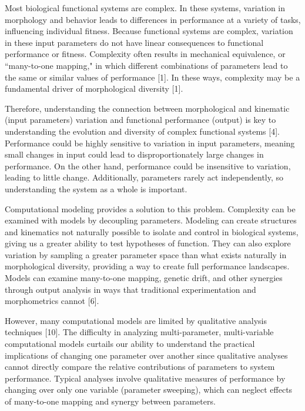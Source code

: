 \documentclass[
]{article}
\begin{document}
Most biological functional systems are complex. In these systems,
variation in morphology and behavior leads to differences in performance
at a variety of tasks, influencing individual fitness. Because
functional systems are complex, variation in these input parameters do
not have linear consequences to functional performance or fitness.
Complexity often results in mechanical equivalence, or ``many-to-one
mapping," in which different combinations of parameters lead to the same
or similar values of performance {[}1{]}. In these ways, complexity may
be a fundamental driver of morphological diversity {[}1{]}.

Therefore, understanding the connection between morphological and
kinematic (input parameters) variation and functional performance
(output) is key to understanding the evolution and diversity of complex
functional systems {[}4{]}. Performance could be highly sensitive to
variation in input parameters, meaning small changes in input could lead
to disproportionately large changes in performance. On the other hand,
performance could be insensitive to variation, leading to little change.
Additionally, parameters rarely act independently, so understanding the
system as a whole is important.

Computational modeling provides a solution to this problem. Complexity
can be examined with models by decoupling parameters. Modeling can
create structures and kinematics not naturally possible to isolate and
control in biological systems, giving us a greater ability to test
hypotheses of function. They can also explore variation by sampling a
greater parameter space than what exists naturally in morphological
diversity, providing a way to create full performance landscapes. Models
can examine many-to-one mapping, genetic drift, and other synergies
through output analysis in ways that traditional experimentation and
morphometrics cannot {[}6{]}.

However, many computational models are limited by qualitative analysis
techniques {[}10{]}. The difficulty in analyzing multi-parameter,
multi-variable computational models curtails our ability to understand
the practical implications of changing one parameter over another since
qualitative analyses cannot directly compare the relative contributions
of parameters to system performance. Typical analyses involve
qualitative measures of performance by changing over only one variable
(parameter sweeping), which can neglect effects of many-to-one mapping
and synergy between parameters.
\end{document}
